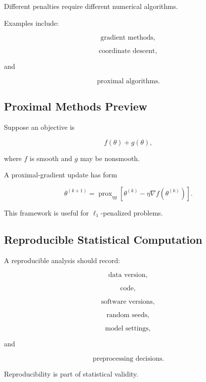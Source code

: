 Different penalties require different numerical algorithms.

Examples include:

\[
\boxed{
\text{gradient methods},
}
\]

\[
\boxed{
\text{coordinate descent},
}
\]

and

\[
\boxed{
\text{proximal algorithms}.
}
\]

\subsection{Proximal Methods Preview}
\label{subsec:proximal-methods-preview}

Suppose an objective is

\[
f(\theta)+g(\theta),
\]

where \(f\) is smooth and \(g\) may be nonsmooth.

A proximal-gradient update has form

\[
\boxed{
\theta^{(k+1)}
=
\operatorname{prox}_{\eta g}
\left[
\theta^{(k)}
-
\eta
\nabla f
(
\theta^{(k)}
)
\right].
}
\]

This framework is useful for \(\ell_1\)-penalized problems.

\subsection{Reproducible Statistical Computation}
\label{subsec:reproducible-statistical-computation}

A reproducible analysis should record:

\[
\boxed{
\text{data version},
}
\]

\[
\boxed{
\text{code},
}
\]

\[
\boxed{
\text{software versions},
}
\]

\[
\boxed{
\text{random seeds},
}
\]

\[
\boxed{
\text{model settings},
}
\]

and

\[
\boxed{
\text{preprocessing decisions}.
}
\]

Reproducibility is part of statistical validity.

